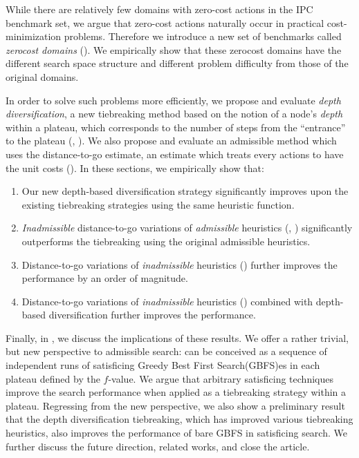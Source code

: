 While there are relatively few domains with zero-cost actions in the IPC
benchmark set, we argue that zero-cost actions naturally occur in
practical cost-minimization problems. Therefore we introduce a new set of
benchmarks called \emph{zerocost domains}
().  We empirically show that these
zerocost domains have the different search space structure and different
problem difficulty from those of the original domains.

In order to solve such problems more efficiently, we propose and
evaluate \emph{depth diversification}, a new
tiebreaking method based on the notion of a node's \emph{depth} within a plateau,
which corresponds to the number of steps from the ``entrance'' to
the plateau (,
). We also propose and evaluate an
admissible method which uses the distance-to-go estimate, an estimate which treats every actions
to have the unit costs ().
In these sections, we empirically show that:
\begin{enumerate}
 \item Our new depth-based diversification strategy significantly improves upon the 
       existing tiebreaking strategies using the same heuristic function.
 \item \emph{Inadmissible} distance-to-go variations of \emph{admissible} heuristics
       (\lmcut, \mands)
       significantly outperforms the tiebreaking using the original admissible heuristics.
 \item Distance-to-go variations of \emph{inadmissible} heuristics
       (\ff) further improves the performance by an order of magnitude.
 \item Distance-to-go variations of \emph{inadmissible} heuristics
       (\ff) combined with depth-based diversification further
       improves the performance.
\end{enumerate}

Finally, in , we discuss the implications of these
results. 
We offer a rather trivial, but new perspective to admissible
\astar search: \astar can be conceived as a sequence of independent runs
of satisficing Greedy Best First Search(GBFS)es in each plateau defined by the
$f$-value. We argue that arbitrary satisficing techniques improve the
search performance when applied as a tiebreaking strategy within
a plateau.
% 
Regressing from the new perspective, we also show a preliminary result
that the depth diversification tiebreaking, which has improved various
tiebreaking heuristics, also improves the performance of bare GBFS in
satisficing search.
We further discuss the future direction, related works, and close the article.

